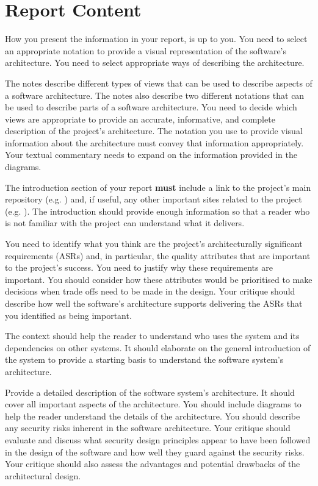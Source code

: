 \documentclass{csse4400}
\begin{document}
\section{Report Content}
How you present the information in your report, is up to you. You need to select an appropriate notation 
to provide a visual representation of the software's architecture. You need to select appropriate ways of describing
the architecture.

The  notes
describe different types of views that can be used to describe aspects of a software architecture.
The notes also describe two different notations that can be used to describe parts of a software architecture.
You need to decide which views are appropriate to provide an accurate, informative, and complete description of the project's architecture.
The notation you use to provide visual information about the architecture must convey that information appropriately.
Your textual commentary needs to expand on the information provided in the diagrams.

The introduction section of your report \textbf{must} include a link to the project's main repository
(e.g. )
and, if useful, any other important sites related to the project
(e.g. ).
The introduction should provide enough information so that a reader who is not familiar with the project can understand what it delivers.

You need to identify what you think are the project's architecturally significant requirements (ASRs)
and, in particular, the quality attributes that are important to the project's success.
You need to justify why these requirements are important.
You should consider how these attributes would be prioritised to make decisions when trade offs need to be made in the design.
Your critique should describe how well the software's architecture supports delivering the ASRs that you identified as being important.

The context should help the reader to understand who uses the system and its dependencies on other systems.
It should elaborate on the general introduction of the system to provide a starting basis to understand the software system's architecture.

Provide a detailed description of the software system's architecture.
It should cover all important aspects of the architecture.
You should include diagrams to help the reader understand the details of the architecture.
You should describe any security risks inherent in the software architecture.
Your critique should evaluate and discuss what security design principles appear to have been followed
in the design of the software and how well they guard against the security risks.
Your critique should also assess the advantages and potential drawbacks of the architectural design.
\end{document}
